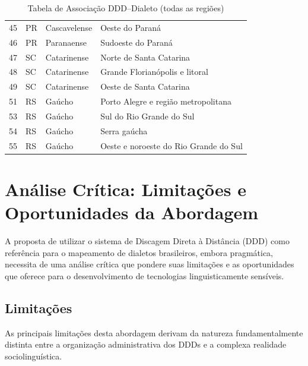 \begin{table}[ht]
\begin{tabular}{llll}
    45 & PR & Cascavelense      & Oeste do Paraná                     \\
    46 & PR & Paranaense        & Sudoeste do Paraná                  \\
    47 & SC & Catarinense       & Norte de Santa Catarina             \\
    48 & SC & Catarinense       & Grande Florianópolis e litoral      \\
    49 & SC & Catarinense       & Oeste de Santa Catarina             \\
    51 & RS & Gaúcho            & Porto Alegre e região metropolitana \\
    53 & RS & Gaúcho            & Sul do Rio Grande do Sul            \\
    54 & RS & Gaúcho            & Serra gaúcha                        \\
    55 & RS & Gaúcho            & Oeste e noroeste do Rio Grande do Sul \\
    \bottomrule
  \end{tabular}
  \caption{Tabela de Associação DDD–Dialeto (todas as regiões)}
  \label{tab:ddd-dialeto-todas}
\end{table}











\section{Análise Crítica: Limitações e Oportunidades da Abordagem}

A proposta de utilizar o sistema de Discagem Direta à Distância (DDD) como referência para o mapeamento de dialetos brasileiros, embora pragmática, necessita de uma análise crítica que pondere suas limitações e as oportunidades que oferece para o desenvolvimento de tecnologias linguisticamente sensíveis.

\subsection{Limitações}


As principais limitações desta abordagem derivam da natureza fundamentalmente distinta entre a organização administrativa dos DDDs e a complexa realidade sociolinguística.

